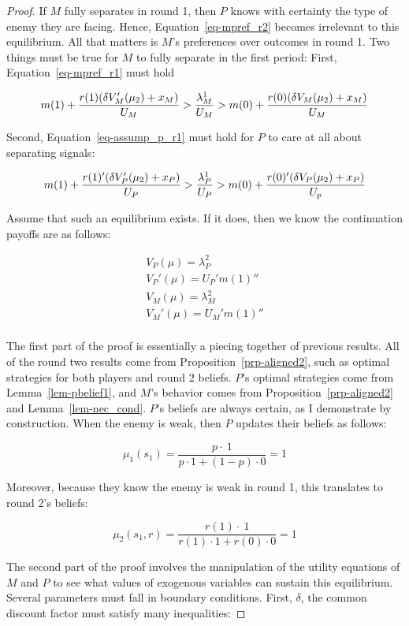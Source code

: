 \documentclass[
  12pt,
]{article}
\theoremstyle{plain}
\theoremstyle{plain}
\theoremstyle{remark}
\begin{document}
\begin{proof}
If \(M\) fully separates in round 1, then \(P\) knows with certainty the
type of enemy they are facing. Hence, Equation~\ref{eq-mpref_r2} becomes
irrelevant to this equilibrium. All that matters is \(M\)'s preferences
over outcomes in round 1. Two things must be true for \(M\) to fully
separate in the first period: First, Equation~\ref{eq-mpref_r1} must
hold

\[
m(1) + \frac{r(1)(\delta V_M'(\mu_2) + x_M)}{U_M} > \frac{\lambda^1_M}{U_M} > m(0) + \frac{r(0)(\delta V_M(\mu_2) + x_M)}{U_M}\\
\]

Second, Equation~\ref{eq-assump_p_r1} must hold for \(P\) to care at all
about separating signals:

\[
m(1) + \frac{r(1)'(\delta V_P'(\mu_2) + x_P)}{U_P} > \frac{\lambda^1_P}{U_P} > m(0) + \frac{r(0)'(\delta V_P(\mu_2) + x_P)}{U_p}\\
\]

Assume that such an equilibrium exists. If it does, then we know the
continuation payoffs are as follows:

\[
\begin{aligned}
V_P(\mu) = \lambda^2_P\\
V_P'(\mu)  = U_P' m(1)''\\
V_M(\mu)  = \lambda^2_M\\
V_M'(\mu)  = U_M' m(1)'' \\
\end{aligned}
\]

The first part of the proof is essentially a piecing together of
previous results. All of the round two results come from
Proposition~\ref{prp-aligned2}, such as optimal strategies for both
players and round 2 beliefs. \(P\)'s optimal strategies come from
Lemma~\ref{lem-pbelief1}, and \(M\)'s behavior comes from
Proposition~\ref{prp-aligned2} and Lemma~\ref{lem-nec_cond}. \(P\)'s
beliefs are always certain, as I demonstrate by construction. When the
enemy is weak, then \(P\) updates their beliefs as follows:

\[
\mu_1(s_1) = \frac{p \cdot \ 1}{p \cdot 1+ (1 - p) \cdot 0} = 1
\]

Moreover, because they know the enemy is weak in round 1, this
translates to round 2's beliefs:

\[
\mu_2(s_1, r) = \frac{r(1) \cdot \ 1}{r(1) \cdot 1+ r(0)\cdot 0} = 1
\]

The second part of the proof involves the manipulation of the utility
equations of \(M\) and \(P\) to see what values of exogenous variables
can sustain this equilibrium. Several parameters must fall in boundary
conditions. First, \(\delta\), the common discount factor must satisfy
many inequalities:


\end{proof}
\end{document}
